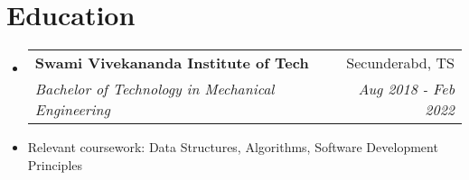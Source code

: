 \documentclass[letterpaper,11pt]{article}
\makeatletter
\newcommand{\resumeItem}[1]{
  \item\small{
    {#1 \vspace{-2pt}}
  }
}
\newcommand{\resumeSubheading}[4]{
  \vspace{-2pt}\item
    \begin{tabular*}{0.97\textwidth}[t]{l@{\extracolsep{\fill}}r}
      \textbf{#1} & #2 \\
      \textit{\small#3} & \textit{\small #4} \\
    \end{tabular*}\vspace{-7pt}
}
\newcommand{\resumeSubHeadingListStart}{\begin{itemize}[leftmargin=0.15in, label={}]}
\newcommand{\resumeSubHeadingListEnd}{\end{itemize}}
\newcommand{\resumeItemListStart}{\begin{itemize}}
\newcommand{\resumeItemListEnd}{\end{itemize}\vspace{-5pt}}
\makeatother
\begin{document}
        
%

\section{Education}
  \resumeSubHeadingListStart
    \resumeSubheading
      {Swami Vivekananda Institute of Tech}{Secunderabd, TS}
      {Bachelor of Technology in Mechanical Engineering}{Aug 2018 - Feb 2022}
      \resumeItem{Relevant coursework: Data Structures, Algorithms, Software Development Principles}
  \resumeSubHeadingListEnd




\end{document}
